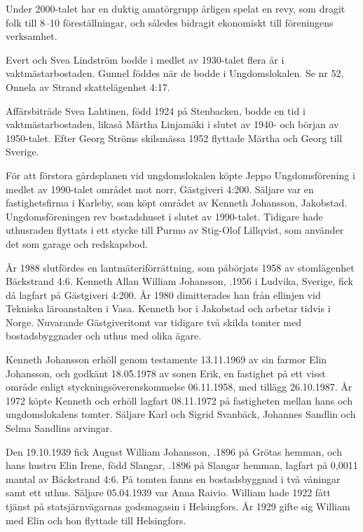 Under 2000-talet har en duktig amatörgrupp årligen spelat en revy, som dragit folk till 8--10 föreställningar, och således bidragit ekonomiskt till föreningens verksamhet.

Evert och Svea Lindström bodde i medlet av 1930-talet flera år i vaktmästarbostaden. Gunnel föddes när de bodde i Ungdomslokalen. Se nr 52, Onnela av Strand skattelägenhet 4:17.

Affärsbiträde Svea Lahtinen, född 1924 på Stenbacken, bodde en tid i vaktmästarbostaden, likaså Märtha Linjamäki i slutet av 1940- och början av 1950-talet. Efter Georg Ströms skilsmässa 1952 flyttade Märtha och Georg till Sverige.





För att förstora gårdsplanen vid ungdomslokalen köpte Jeppo	Ungdomsförening i medlet av 1990-talet området mot norr,	Gästgiveri 4:200. Säljare var en fastighetsfirma i Karleby, som köpt området av Kenneth Johansson, Jakobstad. Ungdomsföreningen	rev bostadshuset i slutet av 1990-talet. Tidigare hade uthusraden	flyttats i ett stycke till Purmo av Stig-Olof Lillqvist, som använder det som garage och redskapsbod.


År 1988 slutfördes en lantmäteriförrättning, som påbörjats 1958	av stomlägenhet Bäckstrand 4:6. Kenneth Allan William Johansson,	.1956 i Ludvika, Sverige, fick då lagfart på Gästgiveri 4:200.	År 1980 dimitterades han från ellinjen vid Tekniska läroanstalten i Vasa.	Kenneth bor i Jakobstad och arbetar tidvis i Norge.	Nuvarande Gästgiveritomt var tidigare två skilda tomter med	bostadsbyggnader och uthus med olika ägare.

Kenneth Johansson erhöll genom testamente 13.11.1969 av sin farmor Elin Johansson, och godkänt 18.05.1978 av sonen Erik, en fastighet på ett visst område enligt styckningsöverenskommelse 06.11.1958, med tillägg 26.10.1987. År 1972 köpte Kenneth och erhöll lagfart 08.11.1972 på fastigheten mellan hans och ungdomslokalens tomter. Säljare Karl och Sigrid Svanbäck, Johannes Sandlin och Selma Sandlins arvingar.


Den 19.10.1939 fick August William Johansson, .1896 på	Grötas hemman, och hans hustru Elin Irene, född Slangar, .1896	på Slangar hemman, lagfart på 0,0011 mantal av Bäckstrand 4:6. På tomten fanns en bostadsbyggnad i två våningar samt ett uthus. Säljare 05.04.1939 var Anna Raivio. William hade 1922 fått tjänst på 	statsjärnvägarnas godsmagasin i Helsingfors. År 1929 gifte sig William med Elin och hon flyttade till Helsingfors.

